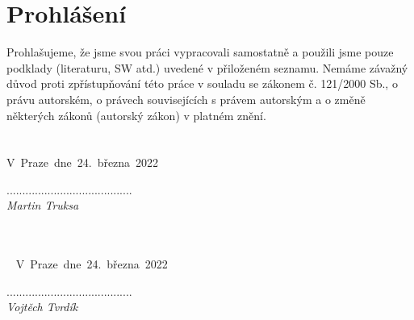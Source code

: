 \null \vfill
\section*{Prohlášení}
Prohlašujeme, že jsme svou práci vypracovali samostatně a použili jsme pouze podklady (literaturu, SW atd.) uvedené v přiloženém seznamu. Nemáme závažný důvod proti zpřístupňování této práce v souladu se zákonem č. 121/2000 Sb., o právu autorském, o právech souvisejících s právem autorským a o změně některých zákonů (autorský zákon) v platném znění.\\\\\\

\noindent
V~Praze~dne~24.~března~2022 
\begin{flushright}
........................................\\
\emph{Martin Truksa~~~~~~~~}
\end{flushright}
~\\~\\~
\noindent
V~Praze~dne~24.~března~2022 
\begin{flushright}
........................................\\
\emph{Vojtěch Tvrdík~~~~~~~~}
\end{flushright}

\thispagestyle{empty} 
\newpage